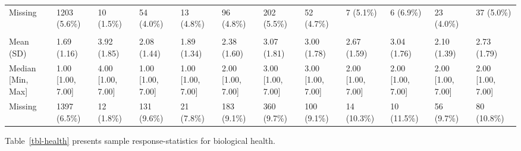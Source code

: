 \documentclass[
  single column]{article}
\begin{document}
\begin{landscape}
\begin{longtable}[t]{llllllllllll}
\hspace{1em}Missing & 1203 (5.6\%) & 10 (1.5\%) & 54 (4.0\%) & 13 (4.8\%) & 96 (4.8\%) & 202 (5.5\%) & 52 (4.7\%) & 7 (5.1\%) & 6 (6.9\%) & 23 (4.0\%) & 37 (5.0\%)\\
\addlinespace[0.3em]
\multicolumn{12}{l}{\textbf{Perceived Religious Discrimination}}\\
\hspace{1em}Mean (SD) & 1.69 (1.16) & 3.92 (1.85) & 2.08 (1.44) & 1.89 (1.34) & 2.38 (1.60) & 3.07 (1.81) & 3.00 (1.78) & 2.67 (1.59) & 3.04 (1.76) & 2.10 (1.39) & 2.73 (1.79)\\
\hspace{1em}Median [Min, Max] & 1.00 [1.00, 7.00] & 4.00 [1.00, 7.00] & 1.00 [1.00, 7.00] & 1.00 [1.00, 7.00] & 2.00 [1.00, 7.00] & 3.00 [1.00, 7.00] & 3.00 [1.00, 7.00] & 2.00 [1.00, 7.00] & 2.00 [1.00, 7.00] & 2.00 [1.00, 7.00] & 2.00 [1.00, 7.00]\\
\hspace{1em}Missing & 1397 (6.5\%) & 12 (1.8\%) & 131 (9.6\%) & 21 (7.8\%) & 183 (9.1\%) & 360 (9.7\%) & 100 (9.1\%) & 14 (10.3\%) & 10 (11.5\%) & 56 (9.7\%) & 80 (10.8\%)\\*

\end{longtable}

\endgroup{}


\end{landscape}

\newpage{}

Table~\ref{tbl-health} presents sample response-statistics for
biological health.
\end{document}
